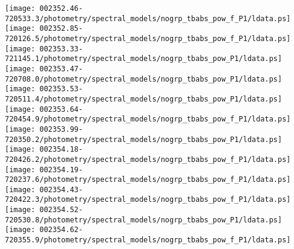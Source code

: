 \documentclass{aastex}
\begin{document}
\begin{figure*}[!ht]
\centering
\texttt{[image: 002352.46-720533.3/photometry/spectral\_models/nogrp\_tbabs\_pow\_f\_P1/ldata.ps]} \hfill 
\texttt{[image: 002352.85-720126.5/photometry/spectral\_models/nogrp\_tbabs\_pow\_f\_P1/ldata.ps]} \hfill 
\texttt{[image: 002353.33-721145.1/photometry/spectral\_models/nogrp\_tbabs\_pow\_P1/ldata.ps]} \\ 
\vspace*{0.5in}
\texttt{[image: 002353.47-720708.0/photometry/spectral\_models/nogrp\_tbabs\_pow\_P1/ldata.ps]} \hfill 
\texttt{[image: 002353.53-720511.4/photometry/spectral\_models/nogrp\_tbabs\_pow\_P1/ldata.ps]} \hfill 
\texttt{[image: 002353.64-720454.9/photometry/spectral\_models/nogrp\_tbabs\_pow\_f\_P1/ldata.ps]} \\ 
\vspace*{0.5in}
\texttt{[image: 002353.99-720350.2/photometry/spectral\_models/nogrp\_tbabs\_pow\_P1/ldata.ps]} \hfill 
\texttt{[image: 002354.18-720426.2/photometry/spectral\_models/nogrp\_tbabs\_pow\_f\_P1/ldata.ps]} \hfill 
\texttt{[image: 002354.19-720237.6/photometry/spectral\_models/nogrp\_tbabs\_pow\_f\_P1/ldata.ps]} \\ 
\vspace*{0.5in}
\texttt{[image: 002354.43-720422.3/photometry/spectral\_models/nogrp\_tbabs\_pow\_f\_P1/ldata.ps]} \hfill 
\texttt{[image: 002354.52-720530.8/photometry/spectral\_models/nogrp\_tbabs\_pow\_P1/ldata.ps]} \hfill 
\texttt{[image: 002354.62-720355.9/photometry/spectral\_models/nogrp\_tbabs\_pow\_f\_P1/ldata.ps]} \\ 
\vspace*{0.5in}
\end{figure*}
\clearpage
\end{document}
